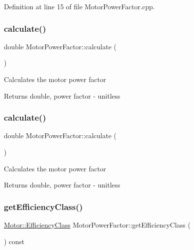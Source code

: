 Definition at line 15 of file Motor\+Power\+Factor.\+cpp.

\mbox{\label{class_motor_power_factor_ac9d5742db4a371bc4e15d5b29d335b6e}} 
\subsubsection{\texorpdfstring{calculate()}{calculate()}\hspace{0.1cm}{\footnotesize\ttfamily [2/3]}}
{\footnotesize\ttfamily double Motor\+Power\+Factor\+::calculate (\begin{DoxyParamCaption}{ }\end{DoxyParamCaption})}

Calculates the motor power factor

\begin{DoxyReturn}{Returns}
double, power factor -\/ unitless 
\end{DoxyReturn}
\mbox{\label{class_motor_power_factor_ac9d5742db4a371bc4e15d5b29d335b6e}} 
\subsubsection{\texorpdfstring{calculate()}{calculate()}\hspace{0.1cm}{\footnotesize\ttfamily [3/3]}}
{\footnotesize\ttfamily double Motor\+Power\+Factor\+::calculate (\begin{DoxyParamCaption}{ }\end{DoxyParamCaption})}

Calculates the motor power factor

\begin{DoxyReturn}{Returns}
double, power factor -\/ unitless 
\end{DoxyReturn}
\mbox{\label{class_motor_power_factor_a1ce98cb6ae9fbf09b05b4b6bd75e5c71}} 
\subsubsection{\texorpdfstring{get\+Efficiency\+Class()}{getEfficiencyClass()}\hspace{0.1cm}{\footnotesize\ttfamily [1/3]}}
{\footnotesize\ttfamily \hyperlink{class_motor_afa022971ae062406a9f588c601673d4e}{Motor\+::\+Efficiency\+Class} Motor\+Power\+Factor\+::get\+Efficiency\+Class (\begin{DoxyParamCaption}{ }\end{DoxyParamCaption}) const\hspace{0.3cm}{\ttfamily [inline]}}

